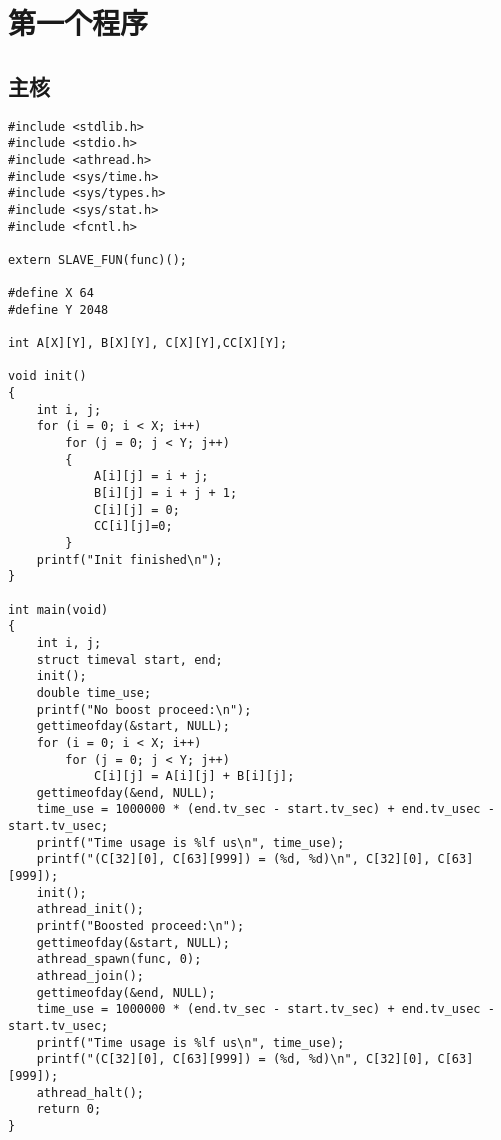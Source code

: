 \chapter{第一个程序}\label{apdx:第一个程序}
\section{主核}
\begin{lstlisting}
#include <stdlib.h>
#include <stdio.h>
#include <athread.h>
#include <sys/time.h>
#include <sys/types.h>
#include <sys/stat.h>
#include <fcntl.h>

extern SLAVE_FUN(func)();

#define X 64
#define Y 2048

int A[X][Y], B[X][Y], C[X][Y],CC[X][Y];

void init()
{
    int i, j;
    for (i = 0; i < X; i++)
        for (j = 0; j < Y; j++)
        {
            A[i][j] = i + j;
            B[i][j] = i + j + 1;
            C[i][j] = 0;
            CC[i][j]=0;
        }
    printf("Init finished\n");
}

int main(void)
{
    int i, j;
    struct timeval start, end;
    init();
    double time_use;
    printf("No boost proceed:\n");
    gettimeofday(&start, NULL);
    for (i = 0; i < X; i++)
        for (j = 0; j < Y; j++)
            C[i][j] = A[i][j] + B[i][j];
    gettimeofday(&end, NULL);
    time_use = 1000000 * (end.tv_sec - start.tv_sec) + end.tv_usec - start.tv_usec;
    printf("Time usage is %lf us\n", time_use);
    printf("(C[32][0], C[63][999]) = (%d, %d)\n", C[32][0], C[63][999]);
    init();
    athread_init();
    printf("Boosted proceed:\n");
    gettimeofday(&start, NULL);
    athread_spawn(func, 0);
    athread_join();
    gettimeofday(&end, NULL);
    time_use = 1000000 * (end.tv_sec - start.tv_sec) + end.tv_usec - start.tv_usec;
    printf("Time usage is %lf us\n", time_use);
    printf("(C[32][0], C[63][999]) = (%d, %d)\n", C[32][0], C[63][999]);
    athread_halt();
    return 0;
}
\end{lstlisting}


